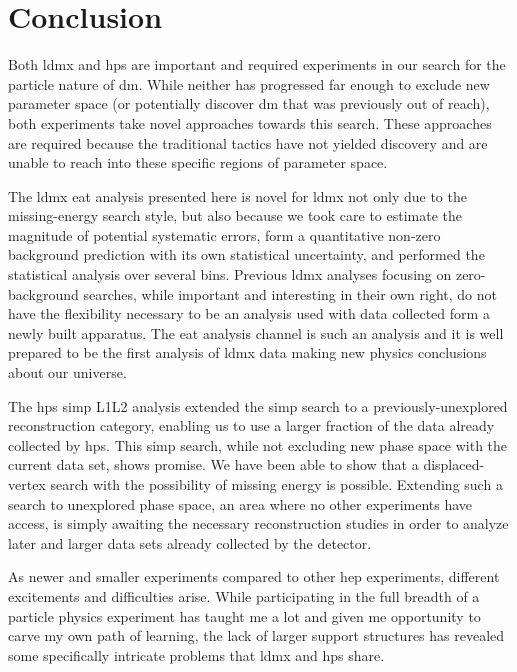 \chapter{Conclusion}
\label{chapter:conclusion}

Both \ac{ldmx} and \ac{hps} are important and required experiments in our search
for the particle nature of \ac{dm}.
While neither has progressed far enough to exclude new parameter space
(or potentially discover \ac{dm} that was previously out of reach),
both experiments take novel approaches towards this search.
These approaches are required because the traditional tactics have not
yielded discovery and are unable to reach into these specific regions
of parameter space.

The \ac{ldmx} \ac{eat} analysis presented here is novel for \ac{ldmx}
not only due to the missing-energy search style, but also because we
took care to estimate the magnitude of potential systematic errors,
form a quantitative non-zero background prediction with its own
statistical uncertainty, and performed the statistical analysis
over several bins.
Previous \ac{ldmx} analyses focusing on zero-background searches,
while important and interesting in their own right, do not have the
flexibility necessary to be an analysis used with data collected
form a newly built apparatus.
The \ac{eat} analysis channel is such an analysis and it is well
prepared to be the first analysis of \ac{ldmx} data making new
physics conclusions about our universe.

The \ac{hps} \ac{simp} L1L2 analysis extended the \ac{simp} search
to a previously-unexplored reconstruction category, enabling us to
use a larger fraction of the data already collected by \ac{hps}.
This \ac{simp} search, while not excluding new phase space with the
current data set, shows promise.
We have been able to show that a displaced-vertex search with
the possibility of missing energy is possible.
Extending such a search to unexplored phase space, an area where no
other experiments have access, is simply awaiting the necessary
reconstruction studies in order to analyze later and larger data
sets already collected by the detector.

As newer and smaller experiments compared to other \ac{hep} experiments,
different excitements and difficulties arise.
While participating in the full breadth of a particle physics experiment
has taught me a lot and given me opportunity to carve my own path of learning,
the lack of larger support structures has revealed some specifically intricate
problems that \ac{ldmx} and \ac{hps} share.

